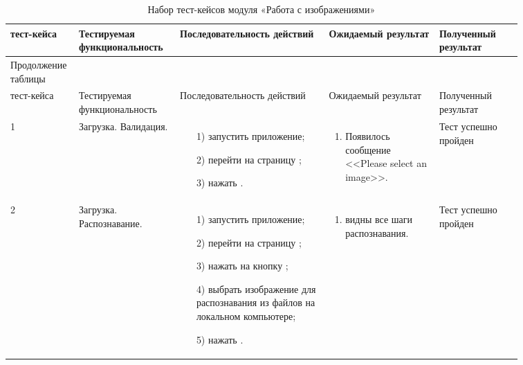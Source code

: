 \begin{longtable}{| >{\raggedright}m{0.06\linewidth} 
                  | >{\raggedright}m{0.18\linewidth} 
                  | >{\raggedright}m{0.27\linewidth} 
                  | >{\raggedright}m{0.2\linewidth} 
                  | >{\raggedright\arraybackslash}m{0.15\linewidth}|}
	\caption{Набор тест-кейсов модуля «Работа с изображениями»}
	\label{table:testing:own_content} \\

   \hline
   \No{} тест-кейса & Тестируемая функциональность & Последовательность действий & Ожидаемый результат & Полученный результат\\
   \endfirsthead

	\multicolumn{3}{@{} l}%
	{{Продолжение таблицы \thetable{}}} \\

	\hline
   	\No{} тест-кейса & Тестируемая функциональность & Последовательность действий & Ожидаемый результат & Полученный результат\\

	\hline 
	\endhead

	\hline
	1 & Загрузка. Валидация. & 
   			\begin{enumerate}
				\item[1)] запустить приложение;
				\item[2)] перейти на страницу \imrPage{};
				\item[3)] нажать \submitButton{}.
			\end{enumerate}
   			& 
   			\begin{enumerate}
   				\item Появилось сообщение <<Please select an image>>.
   			\end{enumerate}
   			& Тест успешно пройден \\
	\hline
	2 & Загрузка. Распознавание. & 
   			\begin{enumerate}
				\item[1)] запустить приложение;
				\item[2)] перейти на страницу \imrPage{};
				\item[3)] нажать на кнопку \selectButton{};
				\item[4)] выбрать изображение для распознавания из файлов на локальном компьютере;
				\item[5)] нажать \submitButton{}.
			\end{enumerate}
   			& 
   			\begin{enumerate}
   				\item видны все шаги распознавания.
   			\end{enumerate}
   			& Тест успешно пройден \\ 


\end{longtable}
